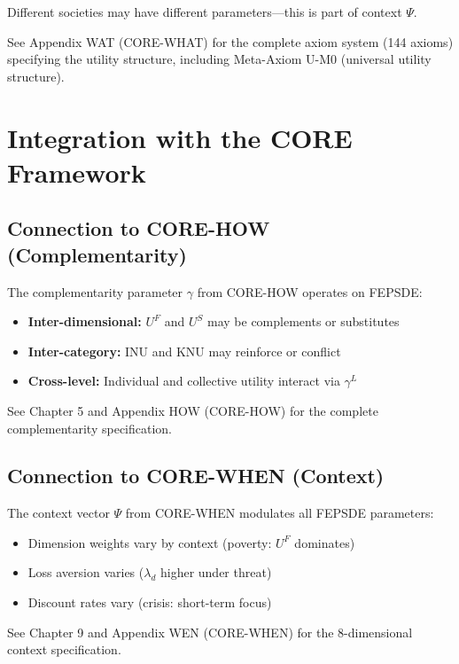Different societies may have different parameters---this is part of context $\Psi$.

\begin{cross-reference}
See Appendix WAT (CORE-WHAT) for the complete axiom system (144 axioms)
specifying the utility structure, including Meta-Axiom U-M0 (universal utility structure).
\end{cross-reference}



\section{Integration with the CORE Framework}
\label{sec:fepsde-integration}


\subsection{Connection to CORE-HOW (Complementarity)}
\label{sec:fepsde-complementarity}

\begin{cross-reference}
The complementarity parameter $\gamma$ from CORE-HOW operates on FEPSDE:
\begin{itemize}[nosep]
  \item \textbf{Inter-dimensional:} $U^F$ and $U^S$ may be complements or substitutes
  \item \textbf{Inter-category:} INU and KNU may reinforce or conflict
  \item \textbf{Cross-level:} Individual and collective utility interact via $\gamma^L$
\end{itemize}
See Chapter 5 and Appendix HOW (CORE-HOW) for the complete complementarity specification.
\end{cross-reference}

\subsection{Connection to CORE-WHEN (Context)}
\label{sec:fepsde-context}

\begin{cross-reference}
The context vector $\Psi$ from CORE-WHEN modulates all FEPSDE parameters:
\begin{itemize}[nosep]
  \item Dimension weights vary by context (poverty: $U^F$ dominates)
  \item Loss aversion varies ($\lambda_d$ higher under threat)
  \item Discount rates vary (crisis: short-term focus)
\end{itemize}
See Chapter 9 and Appendix WEN (CORE-WHEN) for the 8-dimensional context specification.
\end{cross-reference}

